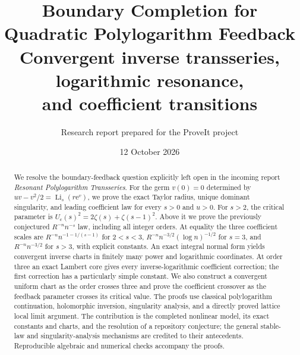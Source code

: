 \documentclass[11pt,a4paper]{article}
\title{\color{ink}\bfseries Boundary Completion for\\Quadratic Polylogarithm Feedback\\[5pt]
  \large Convergent inverse transseries, logarithmic resonance,\\
  and coefficient transitions}
\author{Research report prepared for the ProveIt project}
\date{12 October 2026}
\numberwithin{equation}{section}
\theoremstyle{definition}
\newcommand{\Li}{\operatorname{Li}}
\newcommand{\ee}{\mathrm e}
\newcommand{\Uc}{U_{\mathrm c}}
\begin{document}
\maketitle
\begin{abstract}
We resolve the boundary-feedback question explicitly left open in the
incoming report \emph{Resonant Polylogarithm Transseries}.  For the germ
$v(0)=0$ determined by
$uv-v^2/2=\Li_s(r\ee^v)$, we prove the exact Taylor radius, unique dominant
singularity, and leading coefficient law for every $s>0$ and $u>0$.
For $s>2$, the critical parameter is
$\Uc(s)^2=2\zeta(s)+\zeta(s-1)^2$.  Above it we prove the previously
conjectured $R^{-n}n^{-s}$ law, including all integer orders.  At equality
the three coefficient scales are $R^{-n}n^{-1-1/(s-1)}$ for $2<s<3$,
$R^{-n}n^{-3/2}(\log n)^{-1/2}$ for $s=3$, and $R^{-n}n^{-3/2}$ for
$s>3$, with explicit constants.  An exact integral normal form yields
convergent inverse charts in finitely many power and logarithmic
coordinates.  At order three an exact Lambert core gives every
inverse-logarithmic coefficient correction; the first correction has a
particularly simple constant.  We also construct a convergent uniform
chart as the order crosses three and prove the coefficient crossover
as the feedback parameter crosses its critical value.  The proofs use
classical polylogarithm continuation, holomorphic inversion, singularity
analysis, and a directly proved lattice local limit argument.  The
contribution is the completed nonlinear model, its exact constants and
charts, and the resolution of a repository conjecture; the general
stable-law and singularity-analysis mechanisms are credited to their
antecedents.  Reproducible algebraic and numerical checks accompany the
proofs.
\end{abstract}
\clearpage
\tableofcontents
\newpage








\end{document}

